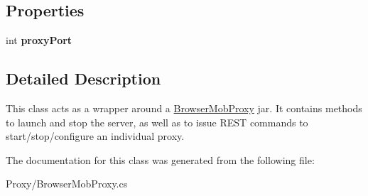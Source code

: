 \subsection*{Properties}
\begin{DoxyCompactItemize}
\item 
\hypertarget{class_proto_test_1_1_golem_1_1_proxy_1_1_browser_mob_proxy_a59230d3bed1ff1c53dae73445c5b598e}{int {\bfseries proxy\-Port}}\label{class_proto_test_1_1_golem_1_1_proxy_1_1_browser_mob_proxy_a59230d3bed1ff1c53dae73445c5b598e}

\end{DoxyCompactItemize}


\subsection{Detailed Description}
This class acts as a wrapper around a \hyperlink{class_proto_test_1_1_golem_1_1_proxy_1_1_browser_mob_proxy}{Browser\-Mob\-Proxy} jar. It contains methods to launch and stop the server, as well as to issue R\-E\-S\-T commands to start/stop/configure an individual proxy. 



The documentation for this class was generated from the following file\-:\begin{DoxyCompactItemize}
\item 
Proxy/Browser\-Mob\-Proxy.\-cs\end{DoxyCompactItemize}
